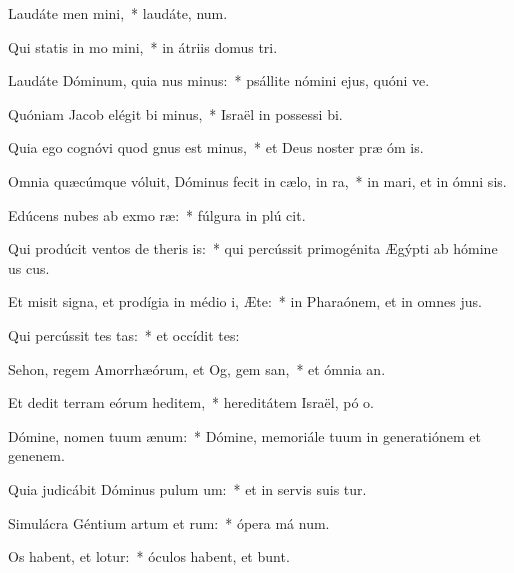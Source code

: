\item Laudáte men mini,~* laudáte,  num.
\item Qui statis in mo mini,~* in átriis domus  tri.
\item Laudáte Dóminum, quia nus minus:~* psállite nómini ejus, quóni ve.
\item Quóniam Jacob elégit bi minus,~* Israël in possessi bi.
\item Quia ego cognóvi quod gnus est minus,~* et Deus noster præ óm is.
\item Omnia quæcúmque vóluit, Dóminus fecit in cælo,  in ra,~* in mari, et in ómni sis.
\item Edúcens nubes ab exmo ræ:~* fúlgura in plú cit.
\item Qui prodúcit ventos de theris is:~* qui percússit primogénita Ægýpti ab hómine us  cus.
\item Et misit signa, et prodígia in médio i, Æte:~* in Pharaónem, et in omnes  jus.
\item Qui percússit tes tas:~* et occídit  tes:
\item Sehon, regem Amorrhæórum, et Og, gem san,~* et ómnia  an.
\item Et dedit terram eórum heditem,~* hereditátem Israël, pó o.
\item Dómine, nomen tuum  ænum:~* Dómine, memoriále tuum in generatiónem et genenem.
\item Quia judicábit Dóminus pulum um:~* et in servis suis tur.
\item Simulácra Géntium artum et rum:~* ópera má num.
\item Os habent, et  lotur:~* óculos habent, et  bunt.
